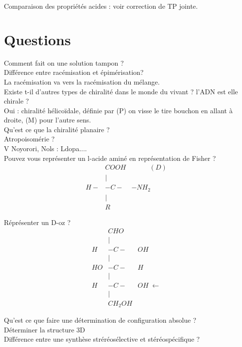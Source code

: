 \documentclass[12pt,prb,aps,epsf]{article}
\begin{document}
Comparaison des propriétés acides : voir correction de TP jointe.

\section*{Questions}
Comment fait on une solution tampon ?\\

Différence entre racémisation et épimérisation?\\
La racémisation va vers la racémisation du mélange.\\

Existe t-il d'autres types de chiralité dans le monde du vivant ? l'ADN est elle chirale ?\\
Oui : chiralité hélicoïdale, définie par (P) on visse le tire bouchon en allant à droite, (M) pour l'autre sens.\\

Qu'est ce que la chiralité planaire ?\\

Atropoisomérie ?\\
V Noyorori, Nols : Ldopa....\\

Pouvez vous représenter un l-acide aminé en représentation de Fisher ?\\
\begin{eqnarray}
&COOH&\hspace{1cm}\;(D)\\
&|&\\
H-&-C-&-NH_2\\
&|&\\
&R&
\end{eqnarray}

Réprésenter un D-oz ?
\begin{eqnarray}
&CHO&\\
&|&\\
H&-C-&OH\\
&|&\\
HO&-C-&H\\
&|&\\
H&-C-&OH \;\leftarrow\\
&|&\\
&CH_2OH&
\end{eqnarray}

Qu'est ce que faire une détermination de configuration absolue ?\\
Déterminer la structure 3D\\

Différence entre une synthèse stréréosélective et stéréospécifique ?\\
\end{document}
